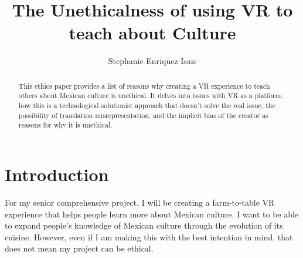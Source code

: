 \documentclass[11pt,twocolumn]{article}
\title{The Unethicalness of using VR to teach about Culture}
\author{Stephanie Enriquez Isais}
\affiliation{Occidental College}
\begin{document}
\maketitle

\begin{abstract}
     This ethics paper provides a list of reasons why creating a VR experience to teach others about Mexican culture is unethical. It delves into issues with VR as a platform, how this is a technological solutionist approach that doesn't solve the real issue, the possibility of translation misrepresentation, and the implicit bias of the creator as reasons for why it is unethical.  
\end{abstract}

\section{Introduction}
For my senior comprehensive project, I will be creating a farm-to-table VR experience that helps people learn more about Mexican culture. I want to be able to expand people's knowledge of Mexican culture through the evolution of its cuisine. However, even if I am making this with the best intention in mind, that does not mean my project can be ethical. 
\end{document}
